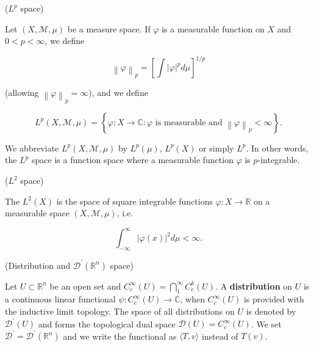 \begin{definition}{($L^{p}$ space) \cite{folland2013real}}

Let $(X,\mathcal{M},\mu)$ be a measure space. If $\varphi$ is a measurable function on $X$ and $0 < p < \infty$, we define

\[ 
    \left\lVert \varphi\right\rVert_{p} = 
    \left[\int |\varphi|^{p}d\mu
    \right]^{1/p}
\]

\vspace{0.05in}
\noindent (allowing $\left\lVert \varphi\right\rVert_{p} = \infty$), and we define

\[
    L^{p}(X,\mathcal{M},\mu) = 
    \left\{ 
    \varphi: X \rightarrow \mathbb{C} : \varphi
    \text{ is measurable and }
    \left\lVert \varphi\right\rVert_{p} < \infty
    \right\}.
\]

\vspace{0.05in}
\noindent We abbreviate $L^{p}(X,\mathcal{M},\mu)$ by $L^{p}(\mu)$, $L^{p}(X)$ or simply $L^{p}$. In other words, the $L^{p}$ space is a function space where a measurable function $\varphi$ is $p$-integrable.

\end{definition}
\vspace{0.1in}

\begin{definition}{($L^{2}$ space) \cite{folland2013real}}

The $L^{2}(X)$ is the space of square integrable functions $\varphi: X \rightarrow \mathbb{R}$ on a measurable space $(X,\mathcal{M},\mu)$, i.e.

\[ \int_{-\infty}^{\infty}|\varphi(x)|^{2}d\mu < \infty . \]

\end{definition}
\vspace{0.1in}

\begin{definition}{(Distribution and $\mathcal{D}^{'}(\mathbb{R}^{n})$ space) \cite{folland2013real}}

Let $U \subset \mathbb{R}^{n}$ be an open set and $C_{c}^{\infty}(U) = \bigcap_{1}^{\infty}C_{c}^{k}(U)$. A \textbf{distribution} on $U$ is a continuous linear functional $\psi : C_{c}^{\infty}(U) \rightarrow \mathbb{C}$, when $C_{c}^{\infty}(U)$ is provided with the inductive limit topology. The space of all distributions on $U$ is denoted by $\mathcal{D}^{'}(U)$ and forms the topological dual space $\mathcal{D}(U) = C_{c}^{\infty}(U)$. We set $\mathcal{D}^{'} = \mathcal{D}^{'}(\mathbb{R}^{n})$ and we write the functional as $\langle T,v \rangle$ instead of $T(v)$.

\end{definition}
\vspace{0.1in}

